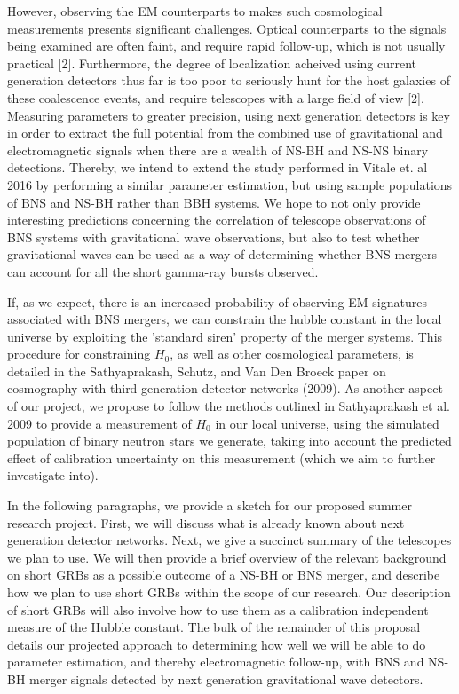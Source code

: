 \documentclass{article}
\begin{document}
However, observing the EM counterparts to makes such cosmological measurements presents significant challenges.  Optical counterparts to the signals being examined are often faint, and require rapid follow-up, which is not usually practical [2].  Furthermore, the degree of localization acheived using current generation detectors thus far is too poor to seriously hunt for the host galaxies of these coalescence events, and require telescopes with a large field of view [2].  Measuring parameters to greater precision, using next generation detectors is key in order to extract the full potential from the combined use of gravitational and electromagnetic signals when there are a wealth of NS-BH and NS-NS binary detections. Thereby, we intend to extend the study performed in Vitale et. al 2016 by performing a similar parameter estimation, but using sample populations of BNS and NS-BH rather than BBH systems.  We hope to not only provide interesting predictions concerning the correlation of telescope observations of BNS systems with gravitational wave observations, but also to test whether gravitational waves can be used as a way of determining whether BNS mergers can account for all the short gamma-ray bursts observed.

If, as we expect, there is an increased probability of observing EM signatures associated with BNS mergers, we can constrain the hubble constant in the local universe by exploiting the 'standard siren' property of the merger systems.  This procedure for constraining $H_{0}$, as well as other cosmological parameters, is detailed in the Sathyaprakash, Schutz, and Van Den Broeck paper on cosmography with third generation detector networks (2009).  As another aspect of our project, we propose to follow the methods outlined in Sathyaprakash et al. 2009 to provide a measurement of $H_0$ in our local universe, using the simulated population of binary neutron stars we generate, taking into account the predicted effect of calibration uncertainty on this measurement (which we aim to further investigate into).

In the following paragraphs, we provide a sketch for our proposed summer research project.  First, we will discuss what is already known about next generation detector networks.  Next, we give a succinct summary of the telescopes we plan to use.  We will then provide a brief overview of the relevant background on short GRBs as a possible outcome of a NS-BH or BNS merger, and describe how we plan to use short GRBs within the scope of our research.  Our description of short GRBs will also involve how to use them as a calibration independent measure of the Hubble constant. The bulk of the remainder of this proposal details our projected approach to determining how well we will be able to do parameter estimation, and thereby electromagnetic follow-up, with BNS and NS-BH merger signals detected by next generation gravitational wave detectors.
\end{document}
